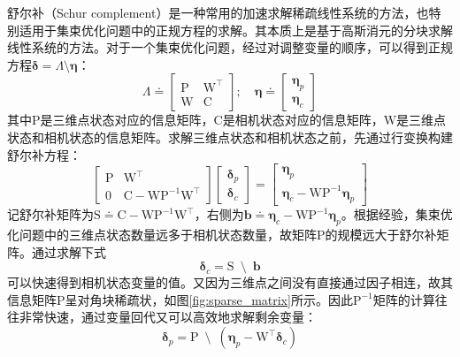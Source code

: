 舒尔补（Schur complement）是一种常用的加速求解稀疏线性系统的方法，也特别适用于集束优化问题中的正规方程的求解。其本质上是基于高斯消元的分块求解线性系统的方法。对于一个集束优化问题，经过对调整变量的顺序，可以得到正规方程$\bm{\delta} =\Lambda\setminus\bm{\eta}$：
\begin{equation}
    \Lambda \doteq
    \begin{bmatrix}
        \mathrm{P} & \mathrm{W}^\top \\
        \mathrm{W} & \mathrm{C}
    \end{bmatrix};
    \quad
    \bm{\eta} \doteq
    \begin{bmatrix} \bm{\eta}_p \\ \bm{\eta}_c \end{bmatrix}
\end{equation}
其中$\mathrm{P}$是三维点状态对应的信息矩阵，$\mathrm{C}$是相机状态对应的信息矩阵，$\mathrm{W}$是三维点状态和相机状态的信息矩阵。求解三维点状态和相机状态之前，先通过行变换构建舒尔补方程：
\begin{equation}
    \begin{bmatrix}
        \mathrm{P} & \mathrm{W}^\top \\
                 0 & \mathrm{C}-\mathrm{W}\mathrm{P}^{-1}\mathrm{W}^\top
    \end{bmatrix}
    \begin{bmatrix} \bm{\delta}_p \\ \bm{\delta}_c \end{bmatrix} =
    \begin{bmatrix}
        \bm{\eta}_p \\
        \bm{\eta}_c-\mathrm{W}\mathrm{P}^{-1}\bm{\eta}_p
    \end{bmatrix}
\end{equation}
记舒尔补矩阵为$\mathrm{S}\doteq\mathrm{C}-\mathrm{W}\mathrm{P}^{-1}\mathrm{W}^\top$，右侧为$\bm{b}\doteq{\bm{\eta}_c-\mathrm{W}\mathrm{P}^{-1}\bm{\eta}_p}$。根据经验，集束优化问题中的三维点状态数量远多于相机状态数量，故矩阵$\mathrm{P}$的规模远大于舒尔补矩阵。通过求解下式
\begin{equation}
    \bm{\delta}_c = \mathrm{S} \enspace\setminus\enspace \bm{b}
    \label{eq:solve_schur}
\end{equation}
可以快速得到相机状态变量的值。又因为三维点之间没有直接通过因子相连，故其信息矩阵$\mathrm{P}$呈对角块稀疏状，如图\ref{fig:sparse_matrix}所示。因此$\mathrm{P}^{-1}$矩阵的计算往往非常快速，通过变量回代又可以高效地求解剩余变量：
\begin{equation}
    \bm{\delta}_p = \mathrm{P}
    \enspace\setminus\enspace
    \left( \bm{\eta}_p-\mathrm{W}^\top\bm{\delta}_c \right)
    \label{eq:back_sub}
\end{equation}

